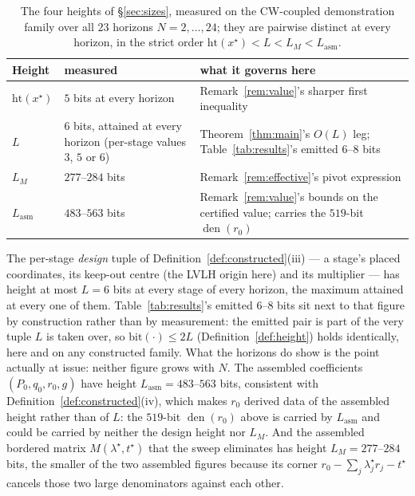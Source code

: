 \documentclass[11pt]{article}
\theoremstyle{definition}
\theoremstyle{remark}
\DeclareMathOperator{\den}{den}
\renewcommand{\_}{\ifdim\fontdimen3\font=0pt\relax\char`\_\else\textunderscore\fi\hspace{0pt}}
\begin{document}
\begin{table}[ht]\centering
\caption{The four heights of \S\ref{sec:sizes}, measured on the CW-coupled
demonstration family over all $23$ horizons $N=2,\dots,24$; they are pairwise
distinct at every horizon, in the strict order
$\mathrm{ht}(x^\star)<L<L_M<L_{\mathrm{asm}}$.}
\label{tab:measured}
\begin{tabular*}{6.1in}{@{}p{1.15in}p{2.35in}p{2.2in}@{}}
\toprule
Height & measured & what it governs here\\
\midrule
$\mathrm{ht}(x^\star)$ & $5$ bits at every horizon &
Remark~\ref{rem:value}'s sharper first inequality\\
\addlinespace
$L$ & $6$ bits, attained at every horizon (per-stage values $3$, $5$ or $6$)
& Theorem~\ref{thm:main}'s $O(L)$ leg; Table~\ref{tab:results}'s emitted
$6$--$8$ bits\\
\addlinespace
$L_M$ & $277$--$284$ bits & Remark~\ref{rem:effective}'s pivot expression\\
\addlinespace
$L_{\mathrm{asm}}$ & $483$--$563$ bits & Remark~\ref{rem:value}'s bounds on
the certified value; carries the $519$-bit $\den(r_0)$\\
\bottomrule
\end{tabular*}
\end{table}

The per-stage \emph{design} tuple of Definition~\ref{def:constructed}(iii) ---
a stage's placed coordinates, its keep-out centre (the LVLH origin here) and
its multiplier --- has height at most $L=6$ bits at every stage of every
horizon, the maximum attained at every one of them. Table~\ref{tab:results}'s
emitted $6$--$8$ bits sit next to that figure by construction rather than by
measurement: the emitted pair is part of the very tuple $L$ is taken over, so
$\mathrm{bit}(\cdot)\le2L$ (Definition~\ref{def:height}) holds identically,
here and on any constructed family. What the horizons do show is the point
actually at issue: neither figure grows with $N$. The assembled
coefficients $(P_0,q_0,r_0,g)$ have height $L_{\mathrm{asm}}=483$--$563$ bits,
consistent with Definition~\ref{def:constructed}(iv), which makes $r_0$
derived data of the assembled height rather than of $L$: the $519$-bit
$\den(r_0)$ above is carried by $L_{\mathrm{asm}}$ and could be carried by
neither the design height nor $L_M$. And the assembled bordered matrix
$M(\lambda^\star,t^\star)$ that the sweep eliminates has height
$L_M=277$--$284$ bits, the smaller of the two assembled figures because its
corner $r_0-\sum_j\lambda^\star_jr_j-t^\star$ cancels those two large
denominators against each other.
\end{document}
